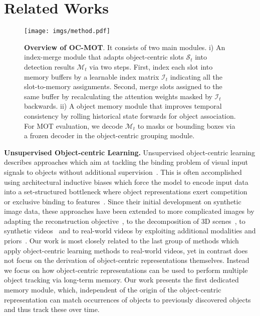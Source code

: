 \section{Related Works}

\begin{figure*}[t]
	\centering
	\texttt{[image: imgs/method.pdf]}
\caption{\textbf{Overview of OC-MOT}. It consists of two main modules. i) An index-merge module that adapts object-centric slots $\mathcal{S}_t$ into detection results $\mathcal{M}_{t}$ via two steps. First, index each slot into memory buffers by a learnable index matrix $\mathcal{I}_{t}$ indicating all the slot-to-memory assignments. Second, merge slots assigned to the same buffer by recalculating the attention weights masked by $\mathcal{I}_{t}$ backwards. ii) A object memory module that improves temporal consistency by rolling historical state forwards for object association. 
For MOT evaluation, we decode $\mathcal{M}_{t}$ to masks or bounding boxes via a frozen decoder in the object-centric grouping module.}
\label{fig:method}
\end{figure*}

\textbf{Unsupervised Object-centric Learning.} 
Unsupervised object-centric learning describes approaches which aim at tackling the binding problem of visual input signals to objects without additional supervision~\cite{greff2020binding}.
This is often accomplished using architectural inductive biases which force the model to encode input data into a set-structured bottleneck where object representations exert competition~\cite{eslami2016attend, locatello2020object, von2020towards} or exclusive binding to features~\cite{greff2017neural, greff2019multi, burgess2019monet, Engelcke2020GENESIS}.
Since their initial development on synthetic image data, these approaches have been extended to more complicated images by adapting the reconstruction objective~\cite{singh2022illiterate, seitzer2022bridging}, to the decomposition of 3D scenes~\cite{chen2021roots, niemeyer2021giraffe, stelzner2021decomposing}, to synthetic videos~\cite{Kosiorek2018SQAIR,Jiang2020SCALOR, crawford2020exploiting,kabra2021simone,kipf2022conditional,singh2022simple} and to real-world videos by exploiting additional modalities and priors~\cite{kipf2022conditional, bao2022discovering, elsayed2022savi++}.
Our work is most closely related to the last group of methods which apply object-centric learning methods to real-world videos, yet in contrast does not focus on the derivation of object-centric representations themselves.
Instead we focus on how object-centric representations can be used to perform multiple object tracking via long-term memory.
Our work presents the first dedicated memory module, which, independent of the origin of the object-centric representation can match occurrences of objects to previously discovered objects and thus track these over time.

